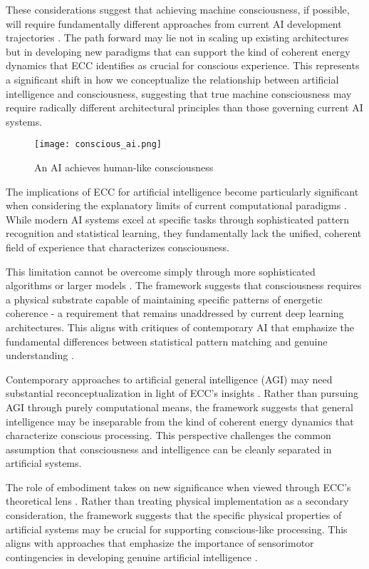 These considerations suggest that achieving machine consciousness, if possible, will require fundamentally different approaches from current AI development trajectories \cite{Dennett2017}. The path forward may lie not in scaling up existing architectures but in developing new paradigms that can support the kind of coherent energy dynamics that ECC identifies as crucial for conscious experience. This represents a significant shift in how we conceptualize the relationship between artificial intelligence and consciousness, suggesting that true machine consciousness may require radically different architectural principles than those governing current AI systems.

\begin{figure}[h]
    \centering
    \texttt{[image: conscious\_ai.png]}

    \caption{An AI achieves human-like consciousness}
\end{figure}

The implications of ECC for artificial intelligence become particularly significant when considering the explanatory limits of current computational paradigms \cite{Hoffman2019}. While modern AI systems excel at specific tasks through sophisticated pattern recognition and statistical learning, they fundamentally lack the unified, coherent field of experience that characterizes consciousness.

This limitation cannot be overcome simply through more sophisticated algorithms or larger models \cite{Mitchell2019}. The framework suggests that consciousness requires a physical substrate capable of maintaining specific patterns of energetic coherence - a requirement that remains unaddressed by current deep learning architectures. This aligns with critiques of contemporary AI that emphasize the fundamental differences between statistical pattern matching and genuine understanding \cite{Marcus2019}.

Contemporary approaches to artificial general intelligence (AGI) may need substantial reconceptualization in light of ECC's insights \cite{Goertzel2007}. Rather than pursuing AGI through purely computational means, the framework suggests that general intelligence may be inseparable from the kind of coherent energy dynamics that characterize conscious processing. This perspective challenges the common assumption that consciousness and intelligence can be cleanly separated in artificial systems.

The role of embodiment takes on new significance when viewed through ECC's theoretical lens \cite{Kurzweil2012}. Rather than treating physical implementation as a secondary consideration, the framework suggests that the specific physical properties of artificial systems may be crucial for supporting conscious-like processing. This aligns with approaches that emphasize the importance of sensorimotor contingencies in developing genuine artificial intelligence \cite{ORegan2011}.

